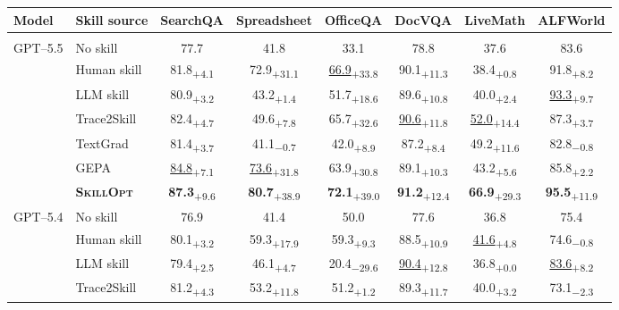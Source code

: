 \documentclass{llmxive}
\providecommand{\ourmethod}{\textsc{SkillOpt}\xspace}
\providecommand{\dvalp}[2]{\hphantom{\textsubscript{+#2}}#1\textsubscript{+#2}}
\providecommand{\dvaln}[2]{\hphantom{\textsubscript{$-$#2}}#1\textsubscript{$-$#2}}
\providecommand{\harnessrow}[1]{\rowcolor{black!7}\multicolumn{8}{l}{\textbf{#1}}}
\providecommand{\methodcell}[1]{\cellcolor{blue!8}#1}
\providecommand{\arraystretch}{1.0}
\begin{document}
\begin{table}[!htbp]
\centering
\scriptsize
\setlength{\tabcolsep}{1.5pt}
\renewcommand{\arraystretch}{1.0}
\begin{tabular}{l l c c c c c c}
\toprule
\textbf{Model} & \textbf{Skill source} & \textbf{SearchQA} & \textbf{Spreadsheet} & \textbf{OfficeQA} & \textbf{DocVQA} & \textbf{LiveMath} & \textbf{ALFWorld} \\
\midrule
\harnessrow{No harness / direct chat} \\
\multirow{7}{*}{GPT--5.5} & No skill & 77.7 & 41.8 & 33.1 & 78.8 & 37.6 & 83.6 \\
 & Human skill & \dvalp{81.8}{4.1} & \dvalp{72.9}{31.1} & \dvalp{\underline{66.9}}{33.8} & \dvalp{90.1}{11.3} & \dvalp{38.4}{0.8} & \dvalp{91.8}{8.2} \\
 & LLM skill & \dvalp{80.9}{3.2} & \dvalp{43.2}{1.4} & \dvalp{51.7}{18.6} & \dvalp{89.6}{10.8} & \dvalp{40.0}{2.4} & \dvalp{\underline{93.3}}{9.7} \\
 & Trace2Skill & \dvalp{82.4}{4.7} & \dvalp{49.6}{7.8} & \dvalp{65.7}{32.6} & \dvalp{\underline{90.6}}{11.8} & \dvalp{\underline{52.0}}{14.4} & \dvalp{87.3}{3.7} \\
 & TextGrad & \dvalp{81.4}{3.7} & \dvaln{41.1}{0.7} & \dvalp{42.0}{8.9} & \dvalp{87.2}{8.4} & \dvalp{49.2}{11.6} & \dvaln{82.8}{0.8} \\
 & GEPA & \dvalp{\underline{84.8}}{7.1} & \dvalp{\underline{73.6}}{31.8} & \dvalp{63.9}{30.8} & \dvalp{89.1}{10.3} & \dvalp{43.2}{5.6} & \dvalp{85.8}{2.2} \\
 & \methodcell{\textbf{\ourmethod{}}} & \methodcell{\dvalp{\textbf{87.3}}{9.6}} & \methodcell{\dvalp{\textbf{80.7}}{38.9}} & \methodcell{\dvalp{\textbf{72.1}}{39.0}} & \methodcell{\dvalp{\textbf{91.2}}{12.4}} & \methodcell{\dvalp{\textbf{66.9}}{29.3}} & \methodcell{\dvalp{\textbf{95.5}}{11.9}} \\
\cmidrule(lr){1-8}
\multirow{7}{*}{GPT--5.4} & No skill & 76.9 & 41.4 & 50.0 & 77.6 & 36.8 & 75.4 \\
 & Human skill & \dvalp{80.1}{3.2} & \dvalp{59.3}{17.9} & \dvalp{59.3}{9.3} & \dvalp{88.5}{10.9} & \dvalp{\underline{41.6}}{4.8} & \dvaln{74.6}{0.8} \\
 & LLM skill & \dvalp{79.4}{2.5} & \dvalp{46.1}{4.7} & \dvaln{20.4}{29.6} & \dvalp{\underline{90.4}}{12.8} & \dvalp{36.8}{0.0} & \dvalp{\underline{83.6}}{8.2} \\
 & Trace2Skill & \dvalp{81.2}{4.3} & \dvalp{53.2}{11.8} & \dvalp{51.2}{1.2} & \dvalp{89.3}{11.7} & \dvalp{40.0}{3.2} & \dvaln{73.1}{2.3} \\

\end{tabular}
\end{table}
\end{document}
